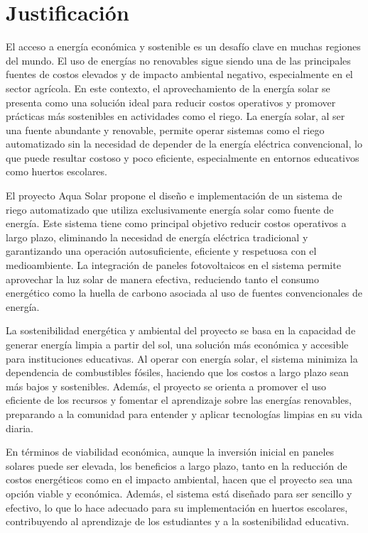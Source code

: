 \documentclass[12pt]{article}
\begin{document}
\newpage
\section{Justificación}
El acceso a energía económica y sostenible es un desafío clave en muchas regiones del mundo. El uso de energías no renovables sigue siendo una de las principales fuentes de costos elevados y de impacto ambiental negativo, especialmente en el sector agrícola. En este contexto, el aprovechamiento de la energía solar se presenta como una solución ideal para reducir costos operativos y promover prácticas más sostenibles en actividades como el riego. La energía solar, al ser una fuente abundante y renovable, permite operar sistemas como el riego automatizado sin la necesidad de depender de la energía eléctrica convencional, lo que puede resultar costoso y poco eficiente, especialmente en entornos educativos como huertos escolares.

El proyecto Aqua Solar propone el diseño e implementación de un sistema de riego automatizado que utiliza exclusivamente energía solar como fuente de energía. Este sistema tiene como principal objetivo reducir costos operativos a largo plazo, eliminando la necesidad de energía eléctrica tradicional y garantizando una operación autosuficiente, eficiente y respetuosa con el medioambiente. La integración de paneles fotovoltaicos en el sistema permite aprovechar la luz solar de manera efectiva, reduciendo tanto el consumo energético como la huella de carbono asociada al uso de fuentes convencionales de energía.

La sostenibilidad energética y ambiental del proyecto se basa en la capacidad de generar energía limpia a partir del sol, una solución más económica y accesible para instituciones educativas. Al operar con energía solar, el sistema minimiza la dependencia de combustibles fósiles, haciendo que los costos a largo plazo sean más bajos y sostenibles. Además, el proyecto se orienta a promover el uso eficiente de los recursos y fomentar el aprendizaje sobre las energías renovables, preparando a la comunidad para entender y aplicar tecnologías limpias en su vida diaria.

En términos de viabilidad económica, aunque la inversión inicial en paneles solares puede ser elevada, los beneficios a largo plazo, tanto en la reducción de costos energéticos como en el impacto ambiental, hacen que el proyecto sea una opción viable y económica. Además, el sistema está diseñado para ser sencillo y efectivo, lo que lo hace adecuado para su implementación en huertos escolares, contribuyendo al aprendizaje de los estudiantes y a la sostenibilidad educativa. \cite{eia2023solar}
\end{document}
